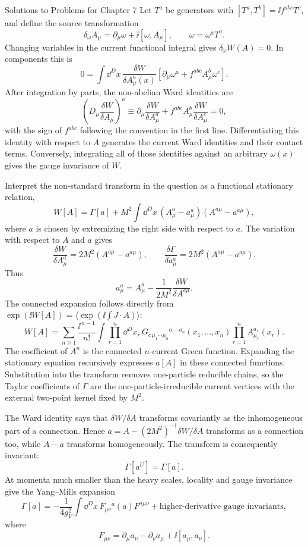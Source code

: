 \begin{bankssolutions}{Solutions to Problems for Chapter 7}
Let $T^a$ be generators with
$[T^a,T^b]=\ii f^{abc}T^c$, and define the source transformation
\[
 \delta_\omega A_\mu
 =\partial_\mu\omega+\ii[\omega,A_\mu],
 \qquad \omega=\omega^aT^a.
\]
Changing variables in the current functional integral gives
$\delta_\omega W(A)=0$.  In components this is
\[
0=\int\dd^D x\,
 \frac{\delta W}{\delta A_\mu^a(x)}
 \left[\partial_\mu\omega^a
 + f^{abc}A_\mu^b\omega^c\right].
\]
After integration by parts, the non-abelian Ward identities are
\begin{equation*}
 \left(D_\mu\frac{\delta W}{\delta A_\mu}\right)^a
 \equiv\partial_\mu\frac{\delta W}{\delta A_\mu^a}
 +f^{abc}A_\mu^b\frac{\delta W}{\delta A_\mu^c}=0,
\end{equation*}
with the sign of $f^{abc}$ following the convention in the first line.
Differentiating this identity with respect to $A$ generates the current
Ward identities and their contact terms.  Conversely, integrating all of
those identities against an arbitrary $\omega(x)$ gives the gauge
invariance of $W$.

Interpret the non-standard transform in the question as a functional
stationary relation,
\[
 W[A]=\Gamma[a]+M^2\int\dd^D x\,
 (A_\mu^a-a_\mu^a)(A^{a\mu}-a^{a\mu}),
\]
where $a$ is chosen by extremizing the right side with respect to $a$.  The
variation with respect to $A$ and $a$ gives
\[
 \frac{\delta W}{\delta A_\mu^a}
 =2M^2(A^{a\mu}-a^{a\mu}),
 \qquad
 \frac{\delta\Gamma}{\delta a_\mu^a}
 =2M^2(A^{a\mu}-a^{a\mu}).
\]
Thus
\[
 a_\mu^a=A_\mu^a-\frac1{2M^2}\frac{\delta W}{\delta A^{a\mu}}.
\]
The connected expansion follows directly from
$\exp(\ii W[A])=\langle\exp(\ii\int J\cdot A)\rangle$:
\[
 W[A]=\sum_{n\geq1}\frac{\ii^{\,n-1}}{n!}
 \int\prod_{r=1}^n\dd^D x_r\,
 G_{c\,\mu_1\cdots\mu_n}{}^{a_1\cdots a_n}(x_1,\ldots,x_n)
 \prod_{r=1}^nA_{\mu_r}^{a_r}(x_r).
\]
The coefficient of $A^n$ is the connected $n$-current Green function.
Expanding the stationary equation recursively expresses $a[A]$ in these
connected functions.  Substitution into the transform removes one-particle
reducible chains, so the Taylor coefficients of $\Gamma$ are the
one-particle-irreducible current vertices with the external two-point
kernel fixed by $M^2$.

The Ward identity says that $\delta W/\delta A$ transforms covariantly as
the inhomogeneous part of a connection.  Hence
$a=A-(2M^2)^{-1}\delta W/\delta A$ transforms as a connection too, while
$A-a$ transforms homogeneously.  The transform is consequently invariant:
\[
 \Gamma[a^U]=\Gamma[a].
\]
At momenta much smaller than the heavy scales, locality and gauge invariance
give the Yang--Mills expansion
\[
 \Gamma[a]=-\frac1{4g_V^2}\int\dd^D x\,
 F_{\mu\nu}{}^a(a)F^{a\mu\nu}
 +\text{higher-derivative gauge invariants},
\]
where
\[
 F_{\mu\nu}=\partial_\mu a_\nu-\partial_\nu a_\mu
 +\ii[a_\mu,a_\nu].
\]


\end{bankssolutions}
